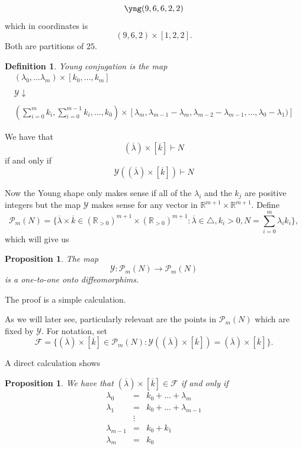 \documentclass[12pt,oneside,openany]{article}
\newtheorem{prop}[theorem]{Proposition}
\newtheorem{definition}[theorem]{Definition}
\def\R{{\mathbb R}} %
\begin{document}
   
 \[
       \yng(9,6,6,2,2)
    \]
  which in coordinates is 
  $$(9, 6, 2) \times [1,2,2].$$
  Both are partitions of $25$.
  
  \begin{definition} Young conjugation is the map 
  $$\begin{array}{c}  (\lambda_0, \ldots \lambda_m) \times [k_0, \ldots , k_m] \\ \\
  \mathcal{Y} \downarrow \\ \\
   \left( \sum_{i=0}^m  k_i,  \sum_{i=0}^{m-1}  k_i, \ldots,k_0\right) \times [\lambda_m, \lambda_{m-1}-\lambda_m, \lambda_{m-2}- \lambda_{m-1}, 
  \ldots , \lambda_0 - \lambda_1)]   \end{array}   $$
    \end{definition}
    
 We have that 
   $$(\overline{\lambda})\times [\overline{k}] \vdash N$$
   if and only if 
   $$ \mathcal{Y}((\overline{\lambda})\times [\overline{k}]) \vdash N$$
   
   
   Now the Young shape only makes sense if all of the $\lambda_i$ and the $ k_j$ are positive integers but the map $\mathcal{Y}$ makes sense for any vector in 
   $\R^{m+1} \times \R^{m+1}.  $
Define
 $$\mathcal{P}_m(N) = \{\overline{\lambda} \times \overline{k} \in (\R_{>0})^{m+1} \times (\R_{>0})^{m+1} : \overline{\lambda} \in \triangle, k_i>0, N = \sum_{i=0}^m \lambda_i k_i \}, $$ which will give us

\begin{prop} The map
$$\mathcal{Y}: \mathcal{P}_m(N) \rightarrow \mathcal{P}_m(N)$$
is a one-to-one onto diffeomorphims.
\end{prop}
The proof is a simple calculation.


As we will later see, particularly relevant are the points in  $\mathcal{P}_m(N)$ which are fixed by $\mathcal{Y}.$
For notation, set 
$$\mathcal{F} = \{ (\overline{\lambda}) \times [\overline{k}] \in \mathcal{P}_m(N): \mathcal{Y} ( (\overline{\lambda}) \times [\overline{k}] ) =  (\overline{\lambda}) \times [\overline{k}] \}.$$

A direct calculation shows  

\begin{prop} We have that  $ (\overline{\lambda}) \times [\overline{k}] \in \mathcal{F}$ if and only if 
\begin{eqnarray*}
\lambda_0 &=& k_0 + \ldots + \lambda_{ m  }  \\
\lambda_1 &=& k_0 + \ldots + \lambda_{ m  -1}  \\
& \vdots &   \\
\lambda_{m-1} &=& k_0 + k_1 \\
\lambda_m &=& k_0
\end{eqnarray*}
\end{prop}
\fi
\end{document}
